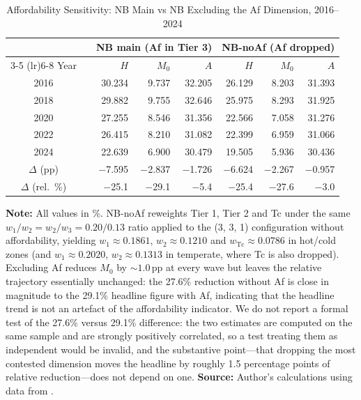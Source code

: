 \documentclass[11pt, a4paper]{article}
\begin{document}
\begin{table}[htb]
\centering
\caption{Affordability Sensitivity: NB Main vs NB Excluding the Af Dimension, 2016--2024}
\small
\begin{tabularx}{\textwidth}{c X rrr rrr}
\toprule
\toprule
& & \multicolumn{3}{c}{NB main (Af in Tier 3)} & \multicolumn{3}{c}{NB-noAf (Af dropped)} \\
\cmidrule(lr){3-5} \cmidrule(lr){6-8}
Year & & $H$ & $M_0$ & $A$ & $H$ & $M_0$ & $A$ \\ \midrule
2016 & & 30.234 & 9.737 & 32.205 & 26.129 & 8.203 & 31.393 \\
2018 & & 29.882 & 9.755 & 32.646 & 25.975 & 8.293 & 31.925 \\
2020 & & 27.255 & 8.546 & 31.356 & 22.566 & 7.058 & 31.276 \\
2022 & & 26.415 & 8.210 & 31.082 & 22.399 & 6.959 & 31.066 \\
2024 & & 22.639 & 6.900 & 30.479 & 19.505 & 5.936 & 30.436 \\ \midrule
$\Delta$ (pp) & & $-$7.595 & $-$2.837 & $-$1.726 & $-$6.624 & $-$2.267 & $-$0.957 \\
$\Delta$ (rel.\ \%) & & $-$25.1 & $-$29.1 & $-$5.4 & $-$25.4 & $-$27.6 & $-$3.0 \\
\bottomrule
\end{tabularx}
\begin{justify}
\scriptsize
\textbf{Note:} All values in \%. NB-noAf reweights Tier 1, Tier 2 and Tc under the same $w_1/w_2 = w_2/w_3 = 0.20/0.13$ ratio applied to the (3, 3, 1) configuration without affordability, yielding $w_1 \approx 0.1861$, $w_2 \approx 0.1210$ and $w_{\mathrm{Tc}} \approx 0.0786$ in hot/cold zones (and $w_1 \approx 0.2020$, $w_2 \approx 0.1313$ in temperate, where Tc is also dropped). Excluding Af reduces $M_0$ by $\sim 1.0$\,pp at every wave but leaves the relative trajectory essentially unchanged: the 27.6\% reduction without Af is close in magnitude to the 29.1\% headline figure with Af, indicating that the headline trend is not an artefact of the affordability indicator. We do not report a formal test of the 27.6\% versus 29.1\% difference: the two estimates are computed on the same sample and are strongly positively correlated, so a test treating them as independent would be invalid, and the substantive point---that dropping the most contested dimension moves the headline by roughly 1.5 percentage points of relative reduction---does not depend on one. \textbf{Source:} Author's calculations using data from \textcite{enigh2016, enigh2018, enigh2020, enigh2022, enigh2024}.
\end{justify}
\label{tab:af_drop}
\end{table}
\end{document}

